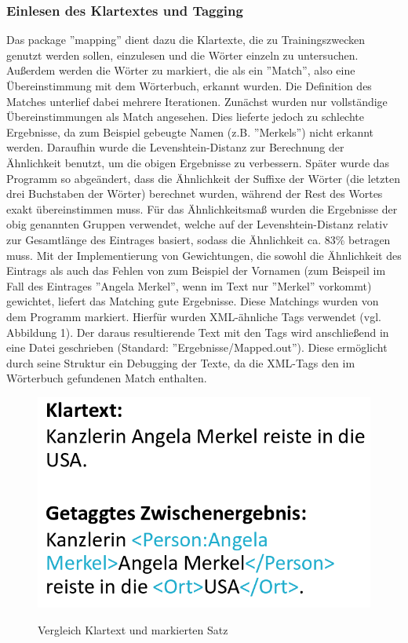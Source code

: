 \documentclass[a4paper]{article}
\begin{document}
		\subsubsection{Einlesen des Klartextes und Tagging}
			Das package ''mapping'' dient dazu die Klartexte, die zu Trainingszwecken genutzt werden sollen, einzulesen und die Wörter einzeln zu untersuchen. 
			Außerdem werden die Wörter zu markiert, die als ein ''Match'', also eine Übereinstimmung mit dem Wörterbuch, erkannt wurden.
			Die Definition des Matches unterlief dabei mehrere Iterationen.
			Zunächst wurden nur vollständige Übereinstimmungen als Match angesehen.
			Dies lieferte jedoch zu schlechte Ergebnisse, da zum Beispiel gebeugte Namen (z.B. ''Merkels'') nicht erkannt werden.
			Daraufhin wurde die Levenshtein-Distanz zur Berechnung der Ähnlichkeit benutzt, um die obigen Ergebnisse zu verbessern.
			Später wurde das Programm so abgeändert, dass die Ähnlichkeit der Suffixe der Wörter (die letzten drei Buchstaben der Wörter) berechnet wurden, während der Rest des Wortes exakt übereinstimmen muss.
			Für das Ähnlichkeitsmaß wurden die Ergebnisse der obig genannten Gruppen verwendet, welche auf der Levenshtein-Distanz relativ zur Gesamtlänge des Eintrages basiert, sodass die Ähnlichkeit ca. 83\% betragen muss.
			Mit der Implementierung von Gewichtungen, die sowohl die Ähnlichkeit des Eintrags als auch das Fehlen von zum Beispiel der Vornamen (zum Beispeil im Fall des Eintrages ''Angela Merkel'', wenn im Text nur ''Merkel'' vorkommt) gewichtet, liefert das Matching gute Ergebnisse.
			Diese Matchings wurden von dem Programm markiert.
			Hierfür wurden XML-ähnliche Tags verwendet (vgl. Abbildung 1).
			Der daraus resultierende Text mit den Tags wird anschließend in eine Datei geschrieben (Standard: ''Ergebnisse/Mapped.out'').
			Diese ermöglicht durch seine Struktur ein Debugging der Texte, da die XML-Tags den im Wörterbuch gefundenen Match enthalten.
			\begin{figure}[htb]
			\centering
			\includegraphics[scale=0.2]{Bild}
			\label{Bild}
			\caption{Vergleich Klartext und markierten Satz}
			\end{figure}
\end{document}
